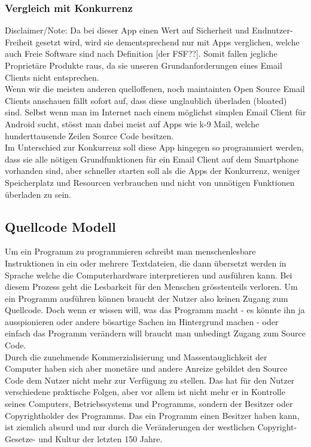 \documentclass[a4paper,11pt]{article}
\begin{document}
\subsubsection{Vergleich mit Konkurrenz}
Disclaimer/Note: Da bei dieser App einen Wert auf Sicherheit und Endnutzer-Freiheit gesetzt wird, wird sie dementsprechend nur mit Apps verglichen, welche auch Freie Software sind nach Definition [der FSF??]. Somit fallen jegliche Proprietäre Produkte raus, da sie unseren Grundanforderungen eines Email Clients nicht entsprechen.\\

Wenn wir die meisten anderen quelloffenen, noch maintainten Open Source Email Clients anschauen fällt sofort auf, dass diese unglaublich überladen (bloated) sind. Selbst wenn man im Internet nach einem möglichst simplen Email Client für Android sucht, stösst man dabei meist auf Apps wie k-9 Mail, welche hunderttausende Zeilen Source Code besitzen.\\

Im Unterschied zur Konkurrenz soll diese App hingegen so programmiert werden, dass sie alle nötigen Grundfunktionen für ein Email Client auf dem Smartphone vorhanden sind, aber schneller starten soll als die Apps der Konkurrenz, weniger Speicherplatz und Resourcen verbrauchen und nicht von unnötigen Funktionen überladen zu sein.

\subsection{Quellcode Modell}
Um ein Programm zu programmieren schreibt man menschenlesbare Instruktionen in ein oder mehrere Textdateien, die dann übersetzt werden in Sprache welche die Computerhardware interpretieren und ausführen kann. Bei diesem Prozess geht die Lesbarkeit für den Menschen grösstenteils verloren. Um ein Programm ausführen können braucht der Nutzer also keinen Zugang zum Quellcode. Doch wenn er wissen will, was das Programm macht - es könnte ihn ja ausspionieren oder andere bösartige Sachen im Hintergrund machen - oder einfach das Programm verändern will braucht man unbedingt Zugang zum Source Code.\\

Durch die zunehmende Kommerzialisierung und Massentauglichkeit der Computer haben sich aber monetäre und andere Anreize gebildet den Source Code dem Nutzer nicht mehr zur Verfügung zu stellen. Das hat für den Nutzer verschiedene praktische Folgen, aber vor allem ist nicht mehr er in Kontrolle seines Computers, Betriebssystems und Programms, sondern der Besitzer oder Copyrightholder des Programms. Das ein Programm einen Besitzer haben kann, ist ziemlich absurd und nur durch die Veränderungen der westlichen Copyright- Gesetze- und Kultur der letzten 150 Jahre.\\
\end{document}
